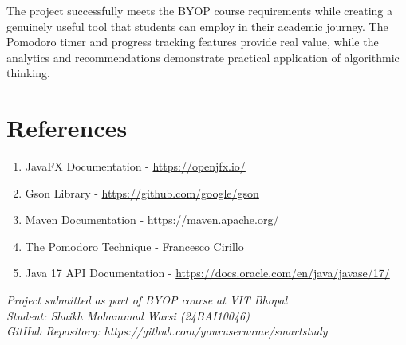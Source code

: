 \documentclass[12pt,a4paper]{article}
\begin{document}
The project successfully meets the BYOP course requirements while creating a genuinely useful tool that students can employ in their academic journey. The Pomodoro timer and progress tracking features provide real value, while the analytics and recommendations demonstrate practical application of algorithmic thinking.

\section{References}

\begin{enumerate}
    \item JavaFX Documentation - \url{https://openjfx.io/}
    \item Gson Library - \url{https://github.com/google/gson}
    \item Maven Documentation - \url{https://maven.apache.org/}
    \item The Pomodoro Technique - Francesco Cirillo
    \item Java 17 API Documentation - \url{https://docs.oracle.com/en/java/javase/17/}
\end{enumerate}

\vfill

\noindent\textit{Project submitted as part of BYOP course at VIT Bhopal} \\
\textit{Student: Shaikh Mohammad Warsi (24BAI10046)} \\
\textit{GitHub Repository: https://github.com/yourusername/smartstudy}
\end{document}
